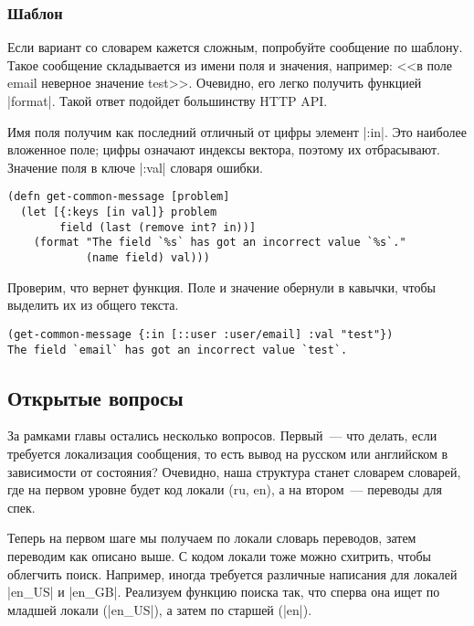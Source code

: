 \subsubsection{Шаблон}

Если вариант со словарем кажется сложным, попробуйте сообщение по шаблону. Такое
сообщение складывается из имени поля и значения, например: <<в поле email
неверное значение test>>.  Очевидно, его легко получить функцией
\spverb|format|. Такой ответ подойдет большинству HTTP API.

Имя поля получим как последний отличный от цифры элемент \spverb|:in|. Это
наиболее вложенное поле; цифры означают индексы вектора, поэтому их
отбрасывают. Значение поля в ключе \spverb|:val| словаря ошибки.

\begin{verbatim}
(defn get-common-message [problem]
  (let [{:keys [in val]} problem
        field (last (remove int? in))]
    (format "The field `%s` has got an incorrect value `%s`."
            (name field) val)))
\end{verbatim}

Проверим, что вернет функция. Поле и значение обернули в кавычки, чтобы выделить
их из общего текста.

\begin{verbatim}
(get-common-message {:in [::user :user/email] :val "test"})
The field `email` has got an incorrect value `test`.
\end{verbatim}


\subsection{Открытые вопросы}

За рамками главы остались несколько вопросов. Первый~--- что делать, если
требуется локализация сообщения, то есть вывод на русском или английском в
зависимости от состояния? Очевидно, наша структура станет словарем словарей, где
на первом уровне будет код локали (ru, en), а на втором~--- переводы для спек.

Теперь на первом шаге мы получаем по локали словарь переводов, затем переводим
как описано выше. С кодом локали тоже можно схитрить, чтобы облегчить
поиск. Например, иногда требуется различные написания для локалей \spverb|en_US| и
\spverb|en_GB|. Реализуем функцию поиска так, что сперва она ищет по младшей локали
(\spverb|en_US|), а затем по старшей (\spverb|en|).

